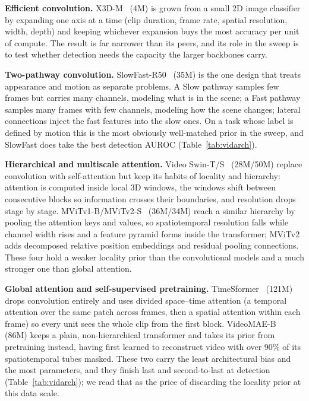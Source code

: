 \noindent\textbf{Efficient convolution.}
X3D-M~\cite{feichtenhofer2020x3d} (4M) is grown from a small 2D image classifier by
expanding one axis at a time (clip duration, frame rate, spatial resolution, width,
depth) and keeping whichever expansion buys the most accuracy per unit of compute. The result is far narrower than its peers, and its role in the sweep is to test
whether detection needs the capacity the larger backbones carry.

\noindent\textbf{Two-pathway convolution.}
SlowFast-R50~\cite{feichtenhofer2019slowfast} (35M) is the one design that treats
appearance and motion as separate problems. A Slow pathway samples few frames but
carries many channels, modeling what is in the scene; a Fast pathway samples many
frames with few channels, modeling how the scene changes; lateral connections inject
the fast features into the slow ones. On a task whose label is defined by motion this
is the most obviously well-matched prior in the sweep, and SlowFast does take the
best detection AUROC (Table~\ref{tab:vidarch}).

\noindent\textbf{Hierarchical and multiscale attention.}
Video Swin-T/S~\cite{liu2022videoswin} (28M/50M) replace convolution with
self-attention but keep its habits of locality and hierarchy: attention is computed
inside local 3D windows, the windows shift between consecutive blocks so information
crosses their boundaries, and resolution drops stage by stage.
MViTv1-B/MViTv2-S~\cite{fan2021mvit,li2022mvitv2} (36M/34M) reach a similar hierarchy
by pooling the attention keys and values, so spatiotemporal resolution falls while
channel width rises and a feature pyramid forms inside the transformer; MViTv2 adds
decomposed relative position embeddings and residual pooling connections. These four
hold a weaker locality prior than the convolutional models and a much stronger one
than global attention.

\noindent\textbf{Global attention and self-supervised pretraining.}
TimeSformer~\cite{bertasius2021timesformer} (121M) drops convolution entirely and
uses divided space--time attention (a temporal attention over the same patch across
frames, then a spatial attention within each frame) so every unit sees the whole
clip from the first block. VideoMAE-B~\cite{tong2022videomae} (86M) keeps a plain,
non-hierarchical transformer and takes its prior from pretraining instead, having
first learned to reconstruct video with over 90\% of its spatiotemporal tubes masked. These two carry the least architectural bias and the most parameters, and they finish
last and second-to-last at detection (Table~\ref{tab:vidarch}); we read that as the
price of discarding the locality prior at this data scale.

